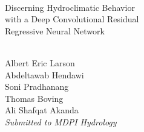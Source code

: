 
\begin{center}
\hspace{}
\\[1.0 in]
Discerning Hydroclimatic Behavior \\
with a Deep Convolutional Residual \\
Regressive Neural Network

\\[1.0 in]

Albert Eric Larson \\ 
Abdeltawab Hendawi \\
Soni Pradhanang \\
Thomas Boving \\ 
Ali Shafqat Akanda \\[1.0in]
\emph{Submitted to MDPI Hydrology}
\end{center}
\newpage
